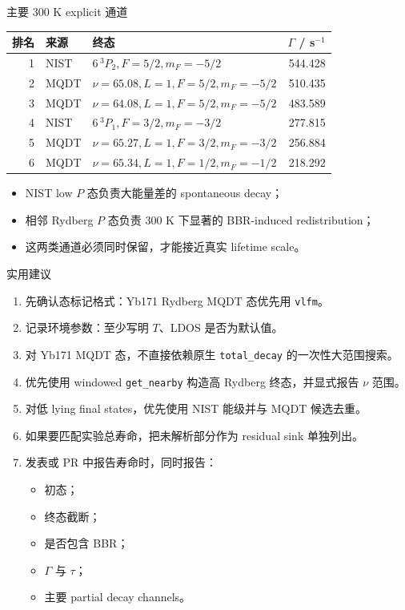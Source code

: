 \documentclass[aspectratio=169,11pt]{ctexbeamer}
\begin{document}
\begin{frame}{主要 300 K explicit 通道}
  \begin{table}
    \centering
    \scriptsize
    \begin{tabular}{rllr}
      \toprule
      排名 & 来源 & 终态 & \(\Gamma\) / s\(^{-1}\) \\
      \midrule
      1 & NIST & \(6\,{}^3P_2,F=5/2,m_F=-5/2\) & 544.428 \\
      2 & MQDT & \(\nu=65.08,L=1,F=5/2,m_F=-5/2\) & 510.435 \\
      3 & MQDT & \(\nu=64.08,L=1,F=5/2,m_F=-5/2\) & 483.589 \\
      4 & NIST & \(6\,{}^3P_1,F=3/2,m_F=-3/2\) & 277.815 \\
      5 & MQDT & \(\nu=65.27,L=1,F=3/2,m_F=-3/2\) & 256.884 \\
      6 & MQDT & \(\nu=65.34,L=1,F=1/2,m_F=-1/2\) & 218.292 \\
      \bottomrule
    \end{tabular}
  \end{table}

  \begin{itemize}
    \item NIST low \(P\) 态负责大能量差的 spontaneous decay；
    \item 相邻 Rydberg \(P\) 态负责 300 K 下显著的 BBR-induced redistribution；
    \item 这两类通道必须同时保留，才能接近真实 lifetime scale。
  \end{itemize}
\end{frame}

\begin{frame}{实用建议}
  \begin{enumerate}
    \item 先确认态标记格式：Yb171 Rydberg MQDT 态优先用 \texttt{vlfm}。
    \item 记录环境参数：至少写明 \(T\)、LDOS 是否为默认值。
    \item 对 Yb171 MQDT 态，不直接依赖原生 \texttt{total\_decay} 的一次性大范围搜索。
    \item 优先使用 windowed \texttt{get\_nearby} 构造高 Rydberg 终态，并显式报告 \(\nu\) 范围。
    \item 对低 lying final states，优先使用 NIST 能级并与 MQDT 候选去重。
    \item 如果要匹配实验总寿命，把未解析部分作为 residual sink 单独列出。
    \item 发表或 PR 中报告寿命时，同时报告：
      \begin{itemize}
        \item 初态；
        \item 终态截断；
        \item 是否包含 BBR；
        \item \(\Gamma\) 与 \(\tau\)；
        \item 主要 partial decay channels。
      \end{itemize}
  \end{enumerate}
\end{frame}
\end{document}
